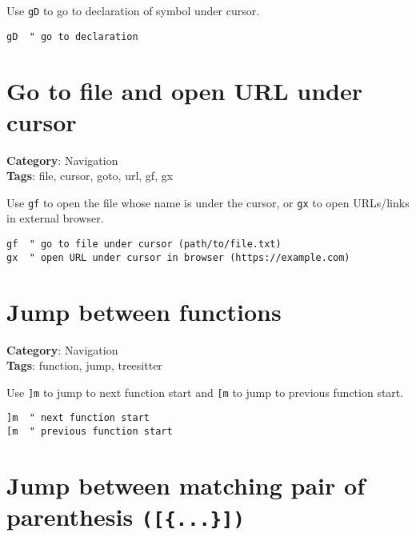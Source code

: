 {{{{{{{{Use {\footnotesize \Verb§gD§} to go to declaration of symbol under cursor.

\begin{Exa*}{}
\begin{Verbatim}[fontsize=\footnotesize, breaklines, breakanywhere]
gD  " go to declaration
\end{Verbatim}
\end{Exa*}

\section{Go to file and open URL under cursor}

\textbf{Category}: Navigation\\ \textbf{Tags}: file, cursor, goto, url, gf, gx
\vspace{0.5cm}

Use {\footnotesize \Verb§gf§} to open the file whose name is under the cursor, or {\footnotesize \Verb§gx§} to open URLs/links in external browser.

\begin{Exa*}{}
\begin{Verbatim}[fontsize=\footnotesize, breaklines, breakanywhere]
gf  " go to file under cursor (path/to/file.txt)
gx  " open URL under cursor in browser (https://example.com)
\end{Verbatim}
\end{Exa*}

\section{Jump between functions}

\textbf{Category}: Navigation\\ \textbf{Tags}: function, jump, treesitter
\vspace{0.5cm}

Use {\footnotesize \Verb§]m§} to jump to next function start and {\footnotesize \Verb§[m§} to jump to previous function start.

\begin{Exa*}{}
\begin{Verbatim}[fontsize=\footnotesize, breaklines, breakanywhere]
]m  " next function start
[m  " previous function start
\end{Verbatim}
\end{Exa*}

\section{Jump between matching pair of parenthesis \texttt{([\{...\}])}}

}}}}}}}}
